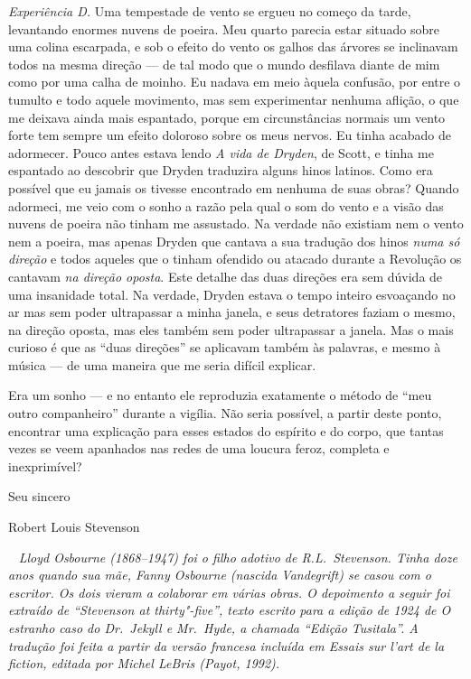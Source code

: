 \textit{Experiência D.}  Uma tempestade de vento se ergueu no começo da
tarde, levantando enormes nuvens de poeira. Meu quarto parecia estar
situado sobre uma colina escarpada, e sob o efeito do vento os galhos
das árvores se inclinavam todos na mesma direção --- de tal modo que o
mundo desfilava diante de mim como por uma calha de moinho.  Eu nadava
em meio àquela confusão, por entre o tumulto e todo aquele
movimento, mas sem experimentar nenhuma aflição, o que me deixava ainda
mais espantado, porque em circunstâncias normais um vento forte tem
sempre um efeito doloroso sobre os meus nervos.  Eu tinha acabado de
adormecer.  Pouco antes estava lendo \textit{A vida de Dryden}, de
Scott, e tinha me espantado ao descobrir que Dryden traduzira alguns
hinos latinos.  Como era possível que eu jamais os tivesse encontrado
em nenhuma de suas obras?  Quando adormeci, me veio com o sonho a razão
pela qual o som do vento e a visão das nuvens de poeira não tinham me
assustado. Na verdade não existiam nem o vento nem a poeira, mas apenas
Dryden que cantava a sua tradução dos hinos \textit{numa só direção} e
todos aqueles que o tinham ofendido ou atacado durante a Revolução os
cantavam \textit{na direção oposta}.  Este detalhe das duas direções		\EP[-1]
era sem dúvida de uma insanidade total.  Na verdade, Dryden estava o
tempo inteiro esvoaçando no ar mas sem poder ultrapassar a minha
janela, e seus detratores faziam o mesmo, na direção oposta, mas eles
também sem poder ultrapassar a janela.  Mas o mais curioso é que as
“duas direções” se aplicavam também às palavras, e mesmo à música --- de
uma maneira que me seria difícil explicar.

Era um sonho --- e no entanto ele reproduzia exatamente o método de “meu
outro companheiro” durante a vigília.  Não seria possível, a partir
deste ponto, encontrar uma explicação para esses estados do espírito e
do corpo, que tantas vezes se veem apanhados nas redes de uma loucura
feroz, completa e inexprimível? 

\bigskip

Seu sincero

Robert Louis Stevenson

\clearpage
\ifodd\thepage ~ \clearpage\else\relax\fi
\thispagestyle{empty}
\mbox{}\vfill
{\noindent\itshape Lloyd Osbourne (1868--1947) foi o filho
adotivo de R.L.~Stevenson.  Tinha doze anos quando sua mãe, Fanny
Osbourne (nascida Vandegrift) se casou com o escritor.  Os dois vieram
a colaborar em várias obras. O depoimento a seguir foi extraído de
“Stevenson at thirty"-five”, texto escrito para a edição de 1924 de
\emph{O estranho caso do Dr.~Jekyll e Mr.~Hyde}, a chamada “Edição Tusitala”. A tradução foi feita a
partir da versão francesa incluída em \emph{Essais sur l’art de la fiction},
editada por Michel LeBris (Payot, 1992).}

